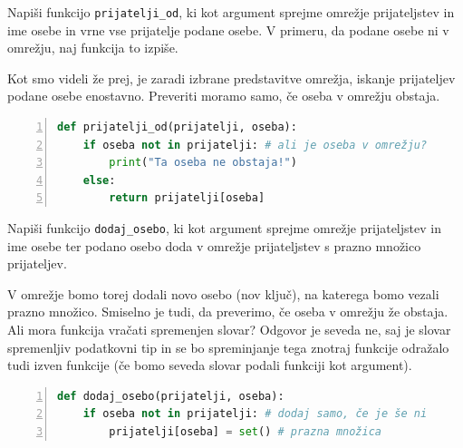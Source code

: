 \begin{zgled}
Napiši funkcijo \texttt{prijatelji\_od}, ki kot argument sprejme omrežje prijateljstev in ime osebe in vrne vse prijatelje podane osebe. V primeru, da podane osebe ni v omrežju, naj funkcija to izpiše.
\end{zgled}
\begin{resitev}
Kot smo videli že prej, je zaradi izbrane predstavitve omrežja, iskanje prijateljev podane osebe enostavno. Preveriti moramo samo, če oseba v omrežju obstaja.
\begin{lstlisting}[language=Python,numbers=left]
def prijatelji_od(prijatelji, oseba):
    if oseba not in prijatelji: # ali je oseba v omrežju?
        print("Ta oseba ne obstaja!")
    else:
        return prijatelji[oseba]
\end{lstlisting}
\end{resitev}

\begin{zgled}
Napiši funkcijo \texttt{dodaj\_osebo}, ki kot argument sprejme omrežje prijateljstev in ime osebe ter podano osebo doda v omrežje prijateljstev s prazno množico prijateljev.
\end{zgled}
\begin{resitev}
V omrežje bomo torej dodali novo osebo (nov ključ), na katerega bomo vezali prazno množico. Smiselno je tudi, da preverimo, če oseba v omrežju že obstaja. Ali mora funkcija vračati spremenjen slovar? Odgovor je seveda ne, saj je slovar spremenljiv podatkovni tip in se bo spreminjanje tega znotraj funkcije odražalo tudi izven funkcije (če bomo seveda slovar podali funkciji kot argument).
\begin{lstlisting}[language=Python,numbers=left]
def dodaj_osebo(prijatelji, oseba):
    if oseba not in prijatelji: # dodaj samo, če je še ni
        prijatelji[oseba] = set() # prazna množica
\end{lstlisting}
\end{resitev}

